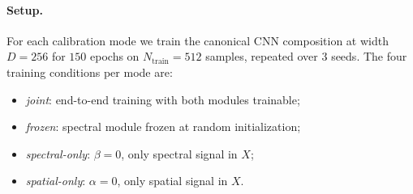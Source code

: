 \paragraph{Setup.} For each calibration mode we train the canonical
CNN composition at width $D = 256$ for $150$ epochs on $N_{\mathrm{train}} =
512$ samples, repeated over $3$ seeds. The four training conditions per
mode are:
\begin{itemize}
    \item \emph{joint}: end-to-end training with both modules trainable;
    \item \emph{frozen}: spectral module frozen at random initialization;
    \item \emph{spectral-only}: $\beta = 0$, only spectral signal in $X$;
    \item \emph{spatial-only}: $\alpha = 0$, only spatial signal in $X$.
\end{itemize}

